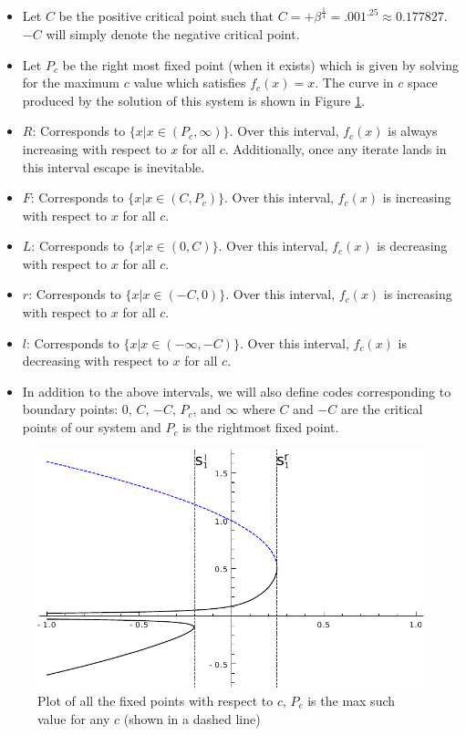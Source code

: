 	\begin{itemize}
		\item Let $C$ be the positive critical point such that $C = + \beta^{\frac{1}{4}} = .001^{.25} \approx 0.177827$. $-C$ will simply denote the negative critical point.
		\item Let $P_c$ be the right most fixed point (when it exists) which is given by solving for the maximum $c$ value which satisfies $f_c (x) = x$. The curve in $c$ space produced by the solution of this system is shown in Figure \ref{pcplot}.
		\item $R$: Corresponds to $\{x | x\in (P_c, \infty)\}$. Over this interval, $f_c (x)$ is always increasing with respect to $x$ for all $c$. Additionally, once any iterate lands in this interval escape is inevitable.

		\item $F$: Corresponds to $\{x | x\in (C, P_c)\}$. Over this interval, $f_c (x)$ is increasing with respect to $x$ for all $c$.

		\item $L$: Corresponds to $\{x | x\in (0, C)\}$. Over this interval, $f_c (x)$ is decreasing with respect to $x$ for all $c$.

		\item $r$: Corresponds to $\{x | x\in (-C, 0)\}$. Over this interval, $f_c (x)$ is increasing with respect to $x$ for all $c$.

		\item $l$: Corresponds to $\{x | x\in (-\infty, -C)\}$. Over this interval, $f_c (x)$ is decreasing with respect to $x$ for all $c$.

		\item In addition to the above intervals, we will also define codes corresponding to boundary points: 0, $C$, $-C$, $P_c$, and $\infty$ where $C$ and $-C$ are the critical points of our system and $P_c$ is the rightmost fixed point.
	\end{itemize}

	\begin{figure}
		\centering
		\includegraphics[width=.75\textwidth]{./img/pc}
		\caption{Plot of all the fixed points with respect to $c$, $P_c$ is the max such value for any $c$ (shown in a dashed line)}
		\label{pcplot}
	\end{figure}

